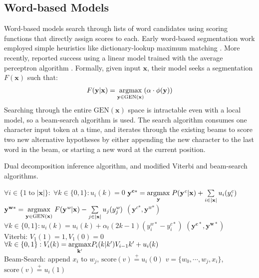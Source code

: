 \subsection{Word-based Models}
Word-based models search through lists of word candidates using scoring functions that directly assign scores to each. 
Early word-based segmentation work employed simple heuristics like dictionary-lookup maximum matching \cite{Chen:1992:ACL}. 
More recently,  reported success using a linear model trained with the average perceptron algorithm \cite{Collins:2002:EMNLP}.
 Formally, given input $\mathbf{x}$, their model seeks a segmentation $F(\mathbf{x})$ such that:
\begin{align*}
F(\mathbf{y}|\mathbf{x}) =  \underset{\mathbf{y} \in \mathrm{GEN}(\mathbf{x})}{\operatorname{argmax}}{ \left( \alpha \cdot \phi(\mathbf{\mathbf{y}}) \right) }
\end{align*}
\noindent Searching through the entire $\mathrm{GEN}(\mathbf{x})$ space is intractable even with a local model, so a beam-search algorithm is used. The search algorithm consumes one character input token at a time, and iterates through the existing beams to score two new alternative hypotheses by either appending the new character to the last word in the beam, or starting a new word at the current position.

\begin{algorithm}[!ht]
\begin{footnotesize}
\caption{Dual decomposition inference algorithm, and modified Viterbi and beam-search algorithms.}
\begin{algorithmic}
\STATE $\forall i \in \{1\; \mathrm{to} \; |\mathbf{x}|\} \colon \; \forall k \in \{0,1\} \colon u_{i}(k) = 0$
\STATE   $\mathbf{y^{c*}} = \underset{\mathbf{y}}{\operatorname{argmax}} \; P(\mathbf{y^\textit{c}} | \mathbf{x}) +  \sum\limits_{i\in |\mathbf{x}|}{u_{i}(y_i^\textit{c})}$ 
\STATE   $\mathbf{y^{w*}} = \underset{\mathbf{y} \in \mathrm{GEN}(\mathbf{x})}{\operatorname{argmax}} \; F(\mathbf{y^\textit{w}} | \mathbf{x}) -  \sum\limits_{j\in |\mathbf{x}|}{ u_{j}(y_j^\textit{w})}$
\RETURN $\left(\mathbf{y^{\textit{c}*}},\mathbf{y^{\textit{w}*}}\right)$
\ENDIF
{}
\STATE  $\forall k \in \{0,1\}: u_i(k)=u_i(k) + \alpha_t (2k-1)(y_i^{w*}-y_i^{c*})$ 
\ENDFOR
\ENDFOR
\RETURN $\left(\mathbf{y^{c*}},\mathbf{y^{w*}}\right)$
 \\\hrulefill
\STATE Viterbi: 
\STATE $V_1(1) = 1, V_1(0) = 0$
\STATE $\forall k \in \{0,1\}: V_i(k) = \underset{\mathbf{k'}}{\operatorname{argmax}} P_i(k | k') V_{i-1}{k'} + u_{i}(k)$ 
\ENDFOR
 \\\hrulefill
\STATE Beam-Search:
\STATE append $x_i$ to $w_j$, $\mathrm{score}(v) \stackrel{+}{=}   u_{i}(0)$
\STATE $v = \{w_0,\cdots,w_j, x_i\}$, $\mathrm{score}(v) \stackrel{+}{=} u_{i}(1)$
\ENDFOR
\ENDFOR
\end{algorithmic}
\label{algo:DD}
\end{footnotesize}
\end{algorithm}


